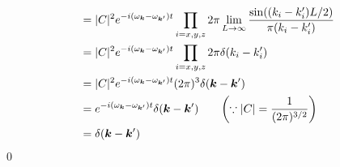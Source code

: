 \documentclass[uplatex,dvipdfmx,a4paper,11pt]{jlreq}
\makeatletter
\newcommand{\kk}{\bm{k}}
\theoremstyle{definition}
\renewenvironment{proof}[1][\proofname]{\par
  \normalfont
  \topsep6\p@\@plus6\p@ \trivlist
  \item[\hskip\labelsep{\bfseries #1}\@addpunct{\bfseries}]\ignorespaces\quad\par
}{%
  \qed\endtrivlist\@endpefalse
}
\renewcommand\proofname{証明}
\makeatother
\begin{document}
\begin{proof}
\begin{align}
                                                                         & = |C|^2e^{-i(\omega_{\kk} - \omega_{\kk'})t}\prod_{i=x,y,z}2\pi\lim_{L\to\infty}\frac{\sin((k_i - k_i')L/2)}{\pi(k_i - k_i')}                  \\
                                                                         & = |C|^2e^{-i(\omega_{\kk} - \omega_{\kk'})t}\prod_{i=x,y,z}2\pi\delta(k_i - k_i')                                                              \\
                                                                         & = |C|^2e^{-i(\omega_{\kk} - \omega_{\kk'})t}(2\pi)^3\delta(\kk - \kk')                                                                         \\
                                                                         & = e^{-i(\omega_{\kk} - \omega_{\kk'})t}\delta(\kk - \kk') \qquad \qty(\because |C| = \frac{1}{(2\pi)^{3/2}})                                   \\
                                                                         & = \delta(\kk - \kk')
  \end{align}
\end{proof}
\end{document}
